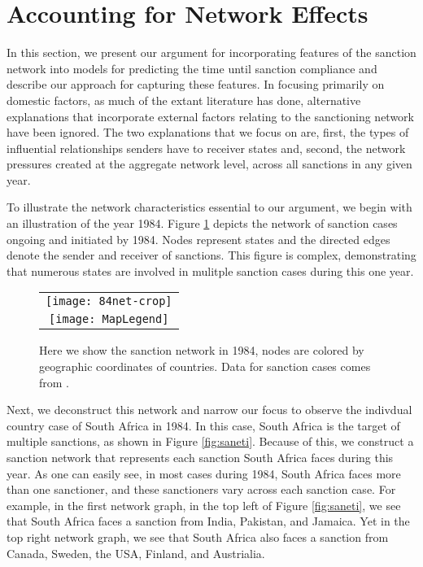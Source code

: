 \section*{Accounting for Network Effects}
\label{neteffects}

In this section, we present our argument for incorporating features of the sanction network into models for predicting the time until sanction compliance and describe our approach for capturing these features. In focusing primarily on domestic factors, as much of the extant literature has done, alternative explanations that incorporate external factors relating to the sanctioning network have been ignored. The two explanations that we focus on are, first, the types of influential relationships senders have to receiver states and, second, the network pressures created at the aggregate network level, across all sanctions in any given year. %

To illustrate the network characteristics essential to our argument, we begin with an illustration of the year 1984. Figure \ref{fig:spaghetti} depicts the network of sanction cases ongoing and initiated by 1984. Nodes represent states and the directed edges denote the sender and receiver of sanctions. This figure is complex, demonstrating that numerous states are involved in mulitple sanction cases during this one year.

\begin{figure}[ht]
  \centering
  \begin{tabular}{c}
	  \texttt{[image: 84net-crop]} \\
	  \texttt{[image: MapLegend]}
  \end{tabular}
  \caption{Here we show the sanction network in 1984, nodes are colored by geographic coordinates of countries. Data for sanction cases comes from \citet{morgan2009threat}.}
  \label{fig:spaghetti}
\end{figure}
\FloatBarrier

Next, we deconstruct this network and narrow our focus to observe the indivdual country case of South Africa in 1984. In this case, South Africa is the target of multiple sanctions, as shown in Figure \ref{fig:saneti}. Because of this, we construct a sanction network that represents each sanction South Africa faces during this year. As one can easily see, in most cases during 1984, South Africa faces more than one sanctioner, and these sanctioners vary across each sanction case. For example, in the first network graph, in the top left of Figure \ref{fig:saneti}, we see that South Africa faces a sanction from India, Pakistan, and Jamaica. Yet in the top right network graph, we see that South Africa also faces a sanction from Canada, Sweden, the USA, Finland, and Austrialia. 

